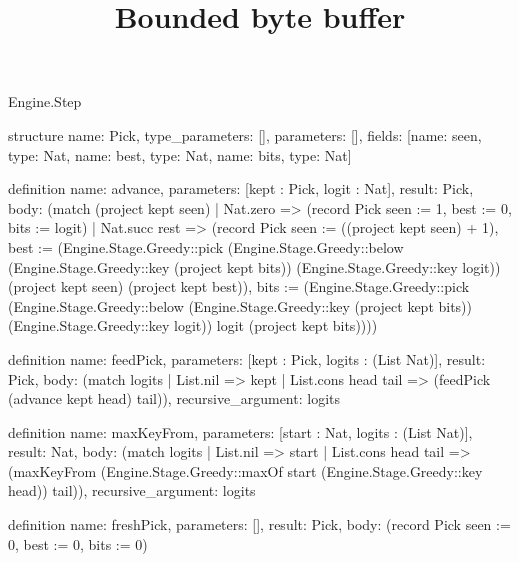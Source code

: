 \begin{lexlean}{Engine.Step}
\title{Bounded byte buffer}
\begin{semanticmodule}
structure{
  name: Pick,
  type_parameters: [],
  parameters: [],
  fields: [{name: seen, type: Nat}, {name: best, type: Nat}, {name: bits, type: Nat}]
}

definition{
  name: advance,
  parameters: [kept : Pick, logit : Nat],
  result: Pick,
  body: (match (project kept seen)
    | Nat.zero => (record Pick {seen := 1, best := 0, bits := logit})
    | Nat.succ rest => (record Pick {seen := ((project kept seen) + 1), best := (Engine.Stage.Greedy::pick (Engine.Stage.Greedy::below (Engine.Stage.Greedy::key (project kept bits)) (Engine.Stage.Greedy::key logit)) (project kept seen) (project kept best)), bits := (Engine.Stage.Greedy::pick (Engine.Stage.Greedy::below (Engine.Stage.Greedy::key (project kept bits)) (Engine.Stage.Greedy::key logit)) logit (project kept bits))}))
}

definition{
  name: feedPick,
  parameters: [kept : Pick, logits : (List Nat)],
  result: Pick,
  body: (match logits
    | List.nil => kept
    | List.cons head tail => (feedPick (advance kept head) tail)),
  recursive_argument: logits
}

definition{
  name: maxKeyFrom,
  parameters: [start : Nat, logits : (List Nat)],
  result: Nat,
  body: (match logits
    | List.nil => start
    | List.cons head tail => (maxKeyFrom (Engine.Stage.Greedy::maxOf start (Engine.Stage.Greedy::key head)) tail)),
  recursive_argument: logits
}

definition{
  name: freshPick,
  parameters: [],
  result: Pick,
  body: (record Pick {seen := 0, best := 0, bits := 0})
}
\end{semanticmodule}
\end{lexlean}
